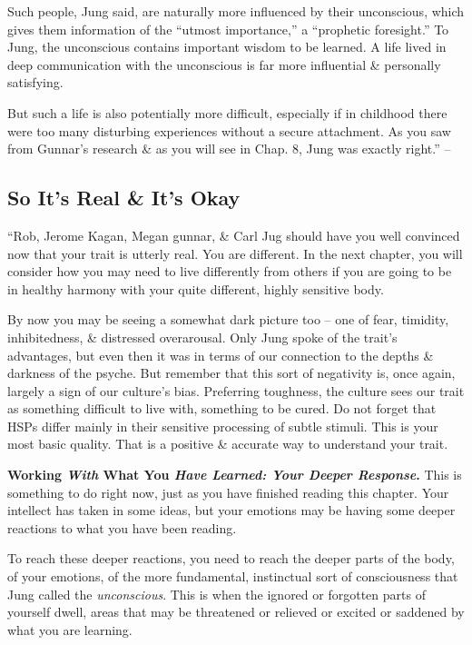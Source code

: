 \documentclass{article}
\numberwithin{equation}{section}
\begin{document}
Such people, Jung said, are naturally more influenced by their unconscious, which gives them information of the ``utmost importance,'' a ``prophetic foresight.'' To Jung, the unconscious contains important wisdom to be learned. A life lived in deep communication with the unconscious is far more influential \& personally satisfying.

But such a life is also potentially more difficult, especially if in childhood there were too many disturbing experiences without a secure attachment. As you saw from Gunnar's research \& as you will see in Chap. 8, Jung was exactly right.'' -- \cite[pp. 70--72]{Aron2013}

\subsection{So It's Real \& It's Okay}
``Rob, Jerome Kagan, Megan gunnar, \& Carl Jug should have you well convinced now that your trait is utterly real. You are different. In the next chapter, you will consider how you may need to live differently from others if you are going to be in healthy harmony with your quite different, highly sensitive body.

By now you may be seeing a somewhat dark picture too -- one of fear, timidity, inhibitedness, \& distressed overarousal. Only Jung spoke of the trait's advantages, but even then it was in terms of our connection to the depths \& darkness of the psyche. But remember that this sort of negativity is, once again, largely a sign of our culture's bias. Preferring toughness, the culture sees our trait as something difficult to live with, something to be cured. Do not forget that HSPs differ mainly in their sensitive processing of subtle stimuli. This is your most basic quality. That is a positive \& accurate way to understand your trait.

\textbf{Working \textit{With} What You \textit{Have Learned: Your Deeper Response}.} This is something to do right now, just as you have finished reading this chapter. Your intellect has taken in some ideas, but your emotions may be having some deeper reactions to what you have been reading.

To reach these deeper reactions, you need to reach the deeper parts of the body, of your emotions, of the more fundamental, instinctual sort of consciousness that Jung called the \textit{unconscious}. This is when the ignored or forgotten parts of yourself dwell, areas that may be threatened or relieved or excited or saddened by what you are learning.
\end{document}
